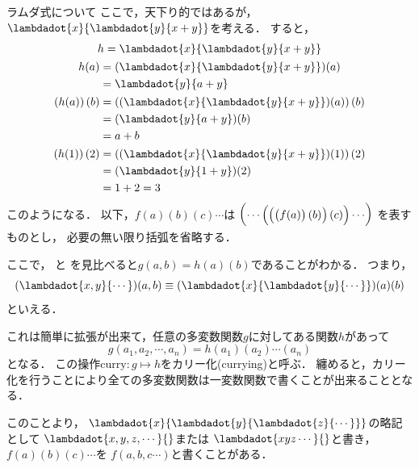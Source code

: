 \documentclass[a4paper,titlepage,report,disablejfam]{jsbook}
\begin{document}
\begin{resbonsiblesection}{ラムダ式について}{\sakamoto}
ここで，天下り的ではあるが，$\lambdadot{x}{\lambdadot{y}{x+y}}$を考える．
すると，
\begin{gather}
\begin{aligned}
\label{eq:lambda-curried}
h &= \lambdadot{x}{\lambdadot{y}{x+y}} \\
\end{aligned} \\
\begin{aligned}
\label{eq:lambda-curried-partial}
h(a) &= (\lambdadot{x}{\lambdadot{y}{x+y}})(a)\\
     &= {\lambdadot{y}{a+y}}
\end{aligned} \\
\begin{aligned}
\label{eq:lambda-curried-inst}
\left(h(a)\right)(b) &= \left((\lambdadot{x}{\lambdadot{y}{x+y}})(a)\right)(b) \\
        &= (\lambdadot{y}{a+y})(b)\\
        &= a + b
\end{aligned} \\
\begin{aligned}
\left(h(1)\right)(2) &= \left((\lambdadot{x}{\lambdadot{y}{x+y}})(1)\right)(2) \\
        &= (\lambdadot{y}{1+y})(2) \\
        &= 1 + 2 = 3
\end{aligned}
\end{gather}
このようになる．
以下，$f(a)(b)(c)\cdots$は
$\delimitershortfall-1pt\left({\cdots\left({\left({\left({f(a)}\right)(b)}\right)(c)}\right)\cdots}\right)$
を表すものとし，
必要の無い限り括弧を省略する．

ここで，
と
を見比べると$g(a, b) = h(a)(b)$であることがわかる．
つまり，
\begin{equation}
(\lambdadot{x,y}{\cdots})(a,b) \equiv (\lambdadot{x}{\lambdadot{y}{\cdots}})(a)(b)
\end{equation}
といえる．

これは簡単に拡張が出来て，任意の多変数関数$g$に対してある関数$h$があって
\begin{equation}
g(a_1, a_2, \cdots, a_n)= h(a_1)(a_2)\cdots(a_n)
\end{equation}
となる．
この操作$\mathrm{curry}: g\mapsto h$をカリー化(currying)と呼ぶ．
纏めると，カリー化を行うことにより全ての多変数関数は一変数関数で書くことが出来ることとなる．

このことより，
$\lambdadot{x}{\lambdadot{y}{\lambdadot{z}{\cdots}}}$の略記として
$\lambdadot{x,y,z,\cdots}{}$または
$\lambdadot{xyz\cdots}{}$と書き，
$f(a)(b)(c)\cdots$を
$f(a,b,c\cdots)$と書くことがある．


\end{resbonsiblesection}
\end{document}
